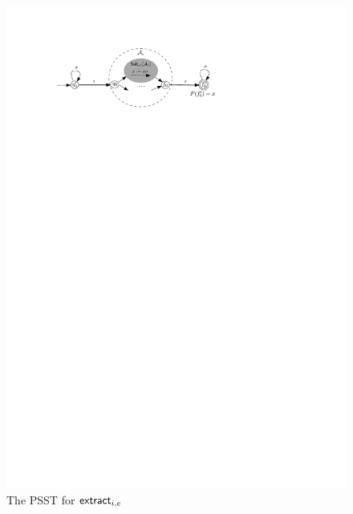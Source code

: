 \begin{figure}[ht]
\centering
\includegraphics[scale=0.8]{psst-extract.pdf}
\caption{The PSST for $\mathsf{extract}_{i,e}$}
\label{fig-psst-extract}
\end{figure}

